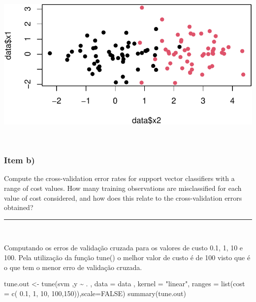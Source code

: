 \documentclass[
  a4paperpaper,
]{article}
\newenvironment{Shaded}{\begin{snugshade}}{\end{snugshade}}
\newcommand{\AttributeTok}[1]{\textcolor[rgb]{0.40,0.45,0.13}{#1}}
\newcommand{\ConstantTok}[1]{\textcolor[rgb]{0.56,0.35,0.01}{#1}}
\newcommand{\DecValTok}[1]{\textcolor[rgb]{0.68,0.00,0.00}{#1}}
\newcommand{\FloatTok}[1]{\textcolor[rgb]{0.68,0.00,0.00}{#1}}
\newcommand{\FunctionTok}[1]{\textcolor[rgb]{0.28,0.35,0.67}{#1}}
\newcommand{\NormalTok}[1]{\textcolor[rgb]{0.00,0.23,0.31}{#1}}
\newcommand{\OtherTok}[1]{\textcolor[rgb]{0.00,0.23,0.31}{#1}}
\newcommand{\SpecialCharTok}[1]{\textcolor[rgb]{0.37,0.37,0.37}{#1}}
\newcommand{\StringTok}[1]{\textcolor[rgb]{0.13,0.47,0.30}{#1}}
\begin{document}
\includegraphics{lista-5_files/figure-pdf/unnamed-chunk-18-1.pdf}

~

\subsubsection{Item b)}\label{item-b-3}

Compute the cross-validation error rates for support vector classifiers
with a range of cost values. How many training observations are
misclassified for each value of cost considered, and how does this
relate to the cross-validation errors obtained?

\begin{center}\rule{0.5\linewidth}{0.5pt}\end{center}

~

Computando os erros de validação cruzada para os valores de custo 0.1,
1, 10 e 100. Pela utilização da função tune() o melhor valor de custo é
de 100 visto que é o que tem o menor erro de validação cruzada.

\begin{Shaded}
\begin{Highlighting}[]
\NormalTok{tune.out }\OtherTok{\textless{}{-}} \FunctionTok{tune}\NormalTok{(svm ,y }\SpecialCharTok{\textasciitilde{}}\NormalTok{ . , }\AttributeTok{data =}\NormalTok{ data , }\AttributeTok{kernel =} \StringTok{"linear"}\NormalTok{,}
                 \AttributeTok{ranges =} \FunctionTok{list}\NormalTok{(}\AttributeTok{cost =} \FunctionTok{c}\NormalTok{( }\FloatTok{0.1}\NormalTok{, }\DecValTok{1}\NormalTok{, }\DecValTok{10}\NormalTok{, }\DecValTok{100}\NormalTok{,}\DecValTok{150}\NormalTok{)),}\AttributeTok{scale=}\ConstantTok{FALSE}\NormalTok{)}
\FunctionTok{summary}\NormalTok{(tune.out)}
\end{Highlighting}
\end{Shaded}
\end{document}
